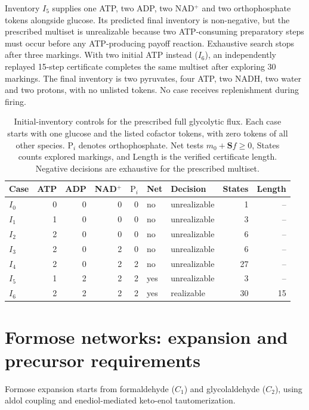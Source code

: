 \documentclass[10pt,a4paper,fleqn]{article}
\theoremstyle{plain}\newtheorem{theorem}{Theorem}
\begin{document}
Inventory $I_5$ supplies one ATP, two ADP, two NAD$^+$ and two orthophosphate tokens alongside glucose. Its predicted final inventory is non-negative, but the prescribed multiset is unrealizable because two ATP-consuming preparatory steps must occur before any ATP-producing payoff reaction. Exhaustive search stops after three markings. With two initial ATP instead ($I_6$), an independently replayed 15-step certificate completes the same multiset after exploring 30 markings. The final inventory is two pyruvates, four ATP, two NADH, two water and two protons, with no unlisted tokens. No case receives replenishment during firing.

\begin{table}[htbp]
\centering
\caption{Initial-inventory controls for the prescribed full glycolytic flux. Each case starts with one glucose and the listed cofactor tokens, with zero tokens of all other species. $\mathrm P_i$ denotes orthophosphate. Net tests $m_0+\mathbf Sf\ge0$, States counts explored markings, and Length is the verified certificate length. Negative decisions are exhaustive for the prescribed multiset.}
\label{tab:glycolysis_inventory_controls}
\scriptsize
\setlength{\tabcolsep}{3pt}
\begin{tabular*}{\linewidth}{@{\extracolsep{\fill}}lrrrrllrr@{}}
\toprule
Case & ATP & ADP & NAD$^+$ & $\mathrm P_i$ & Net & Decision & States & Length \\
\midrule
$I_0$ & 0 & 0 & 0 & 0 & no & unrealizable & 1 & -- \\
$I_1$ & 1 & 0 & 0 & 0 & no & unrealizable & 3 & -- \\
$I_2$ & 2 & 0 & 0 & 0 & no & unrealizable & 6 & -- \\
$I_3$ & 2 & 0 & 2 & 0 & no & unrealizable & 6 & -- \\
$I_4$ & 2 & 0 & 2 & 2 & no & unrealizable & 27 & -- \\
$I_5$ & 1 & 2 & 2 & 2 & yes & unrealizable & 3 & -- \\
$I_6$ & 2 & 2 & 2 & 2 & yes & realizable & 30 & 15 \\
\bottomrule
\end{tabular*}
\end{table}

\section{Formose networks: expansion and precursor requirements}
\label{sec:si_case_formose}

Formose expansion starts from formaldehyde ($C_1$) and glycolaldehyde ($C_2$), using aldol coupling and enediol-mediated keto-enol tautomerization.
\end{document}

